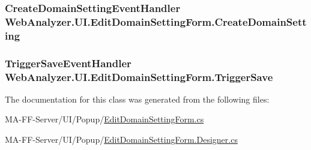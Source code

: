 \subsubsection[{Create\+Domain\+Setting}]{\setlength{\rightskip}{0pt plus 5cm}Create\+Domain\+Setting\+Event\+Handler Web\+Analyzer.\+U\+I.\+Edit\+Domain\+Setting\+Form.\+Create\+Domain\+Setting}\label{class_web_analyzer_1_1_u_i_1_1_edit_domain_setting_form_a15f150af99974a02e7df872db755b121}
\hypertarget{class_web_analyzer_1_1_u_i_1_1_edit_domain_setting_form_a1ddda08125c245cc97c50557b40f5fa2}{}
\subsubsection[{Trigger\+Save}]{\setlength{\rightskip}{0pt plus 5cm}Trigger\+Save\+Event\+Handler Web\+Analyzer.\+U\+I.\+Edit\+Domain\+Setting\+Form.\+Trigger\+Save}\label{class_web_analyzer_1_1_u_i_1_1_edit_domain_setting_form_a1ddda08125c245cc97c50557b40f5fa2}


The documentation for this class was generated from the following files\+:\begin{DoxyCompactItemize}
\item 
M\+A-\/\+F\+F-\/\+Server/\+U\+I/\+Popup/\hyperlink{_edit_domain_setting_form_8cs}{Edit\+Domain\+Setting\+Form.\+cs}\item 
M\+A-\/\+F\+F-\/\+Server/\+U\+I/\+Popup/\hyperlink{_edit_domain_setting_form_8_designer_8cs}{Edit\+Domain\+Setting\+Form.\+Designer.\+cs}\end{DoxyCompactItemize}
